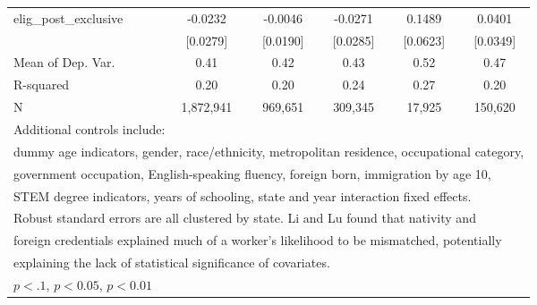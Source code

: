\begin{table}[htbp]
\begin{tabular}{l*{5}{c}}
\addlinespace
elig\_post\_exclusive &     -0.0232         &     -0.0046         &     -0.0271         &      0.1489\sym{**} &      0.0401         \\
                    &    [0.0279]         &    [0.0190]         &    [0.0285]         &    [0.0623]         &    [0.0349]         \\
\midrule
Mean of Dep. Var.   &        0.41         &        0.42         &        0.43         &        0.52         &        0.47         \\
R-squared           &        0.20         &        0.20         &        0.24         &        0.27         &        0.20         \\
N                   &   1,872,941         &     969,651         &     309,345         &      17,925         &     150,620         \\
\bottomrule
\multicolumn{6}{l}{\footnotesize Additional controls include:}\\
\multicolumn{6}{l}{\footnotesize dummy age indicators, gender, race/ethnicity, metropolitan residence, occupational category,}\\
\multicolumn{6}{l}{\footnotesize government occupation, English-speaking fluency, foreign born, immigration by age 10,}\\
\multicolumn{6}{l}{\footnotesize STEM degree indicators, years of schooling, state and year interaction fixed effects.}\\
\multicolumn{6}{l}{\footnotesize Robust standard errors are all clustered by state. Li and Lu found that nativity and}\\
\multicolumn{6}{l}{\footnotesize foreign credentials explained much of a worker's likelihood to be mismatched, potentially}\\
\multicolumn{6}{l}{\footnotesize explaining the lack of statistical significance of covariates.}\\
\multicolumn{6}{l}{\footnotesize \sym{*} \(p<.1\), \sym{**} \(p<0.05\), \sym{***} \(p<0.01\)}\\
\end{tabular}
\end{table}
